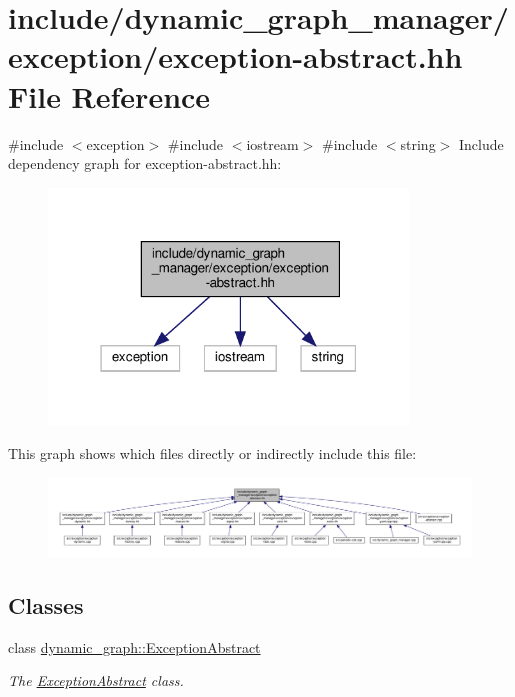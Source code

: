 \hypertarget{exception-abstract_8hh}{}\section{include/dynamic\+\_\+graph\+\_\+manager/exception/exception-\/abstract.hh File Reference}
\label{exception-abstract_8hh}
{\ttfamily \#include $<$exception$>$}\newline
{\ttfamily \#include $<$iostream$>$}\newline
{\ttfamily \#include $<$string$>$}\newline
Include dependency graph for exception-\/abstract.hh\+:
\nopagebreak
\begin{figure}[H]
\begin{center}
\leavevmode
\includegraphics[width=271pt]{exception-abstract_8hh__incl}
\end{center}
\end{figure}
This graph shows which files directly or indirectly include this file\+:
\nopagebreak
\begin{figure}[H]
\begin{center}
\leavevmode
\includegraphics[width=350pt]{exception-abstract_8hh__dep__incl}
\end{center}
\end{figure}
\subsection*{Classes}
\begin{DoxyCompactItemize}
\item 
class \hyperlink{classdynamic__graph_1_1ExceptionAbstract}{dynamic\+\_\+graph\+::\+Exception\+Abstract}
\begin{DoxyCompactList}\small\item\em The \hyperlink{classdynamic__graph_1_1ExceptionAbstract}{Exception\+Abstract} class. \end{DoxyCompactList}\end{DoxyCompactItemize}
